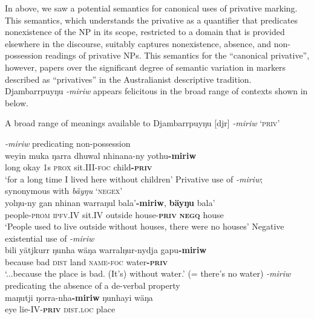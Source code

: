 \documentclass[output=paper]{langsci/langscibook}
\begin{document}
In  above, we saw a potential semantics for canonical uses of privative marking. This semantics, which understands the privative as a quantifier that predicates nonexistence of the NP in its scope, restricted to a domain that is provided elsewhere in the discourse, suitably captures nonexistence, absence, and non-possession readings of privative \textsc{NP}s. This semantics for the ``canonical privative'', however, papers over the significant degree of semantic variation in markers described as ``privatives'' in the Australianist descriptive tradition. Djambarrpuyŋu \textit{-miriw} appears felicitous in the broad range of contexts shown in  below.
\begin{exe}\ex\label{ex:austr-djamb-range}
    A broad range of meanings available to 
    Djambarrpuyŋu [djr] \textit{-miriw} `\textsc{priv}'
    \begin{xlist}
\ex \emph{-miriw} predicating non-possession\\
\gll weyin muka ŋarra dhuwal nhinana-ny yothu\textbf{-miriw}\\
long okay 1s \textsc{prox} sit.III-\textsc{foc} child\textsc{\textbf{-priv}}\\
\glt `for a long time I lived here without children' \hfill \citep[445]{Wilkinson1991}
%
\ex Privative use of \emph{-miriw}; synonymous with \emph{bäyŋu} `\textsc{negex}'\\
\gll yolŋu-ny gan nhinan warraŋul bala'\textbf{-miriw}, \textbf{bäyŋu} bala'\\
people-\textsc{prom} \textsc{ipfv.IV} sit\textsc{.IV} outside house\textsc{-\textbf{priv}} \textsc{\textbf{negq}} house\\
\glt  `People used to live outside without houses, there were no houses' \hfill \citep[443]{Wilkinson1991}
%
\ex Negative existential use of \emph{-miriw}\\
\gll bili yätjkurr ŋunha wäŋa warralŋur-nydja gapu\textbf{-miriw}\\
because bad \textsc{dist} land \textsc{name-foc} water\textsc{\textbf{-priv}}\\
\glt  `...because the place is bad. (It's) without water.' (= there's no water) \hfill \citep[443]{Wilkinson1991}
%
    \ex\label{ex:austr-djamb-range-sleep} 
    \emph{-miriw} predicating the absence of a de-verbal property\\
\gll maŋutji ŋorra-nha\textbf{-miriw} ŋunhayi wäŋa\\
eye lie-IV\textsc{-\textbf{priv}} \textsc{dist}.\textsc{loc} place\\

\end{xlist}
\end{exe}
\end{document}
